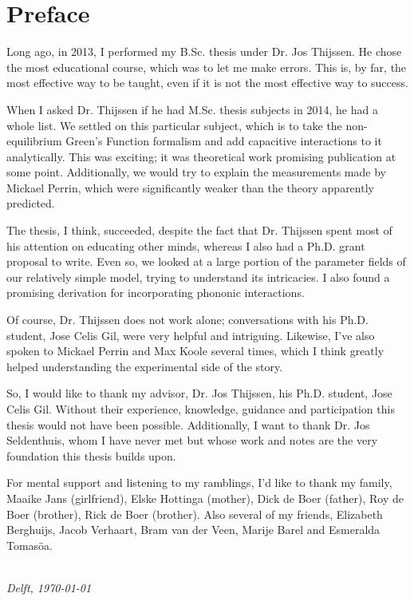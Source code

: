 \chapter*{Preface}

Long ago, in 2013, I performed my B.Sc. thesis under Dr. Jos Thijssen. He chose the most educational course, which was to let me make errors. This is, by far, the most effective way to be taught, even if it is not the most effective way to success.

When I asked Dr. Thijssen if he had M.Sc. thesis subjects in 2014, he had a whole list. We settled on this particular subject, which is to take the non-equilibrium Green's Function formalism and add capacitive interactions to it analytically.  This was exciting; it was theoretical work promising publication at some point. Additionally, we would try to explain the measurements made by Mickael Perrin, which were significantly weaker than the theory apparently predicted.

The thesis, I think, succeeded, despite the fact that Dr. Thijssen spent most of his attention on educating other minds, whereas I also had a Ph.D. grant proposal to write. Even so, we looked at a large portion of the parameter fields of our relatively simple model, trying to understand its intricacies. I also found a promising derivation for incorporating phononic interactions.

Of course, Dr. Thijssen does not work alone; conversations with his Ph.D. student, Jose Celis Gil, were very helpful and intriguing. Likewise, I've also spoken to Mickael Perrin and Max Koole several times, which I think greatly helped understanding the experimental side of the story. 

So, I would like to thank my advisor, Dr. Jos Thijssen, his Ph.D. student, Jose Celis Gil. Without their experience, knowledge, guidance and participation this thesis would not have been possible. Additionally, I want to thank Dr. Jos Seldenthuis, whom I have never met but whose work and notes are the very foundation this thesis builds upon.

For mental support and listening to my ramblings, I'd like to thank my family, Maaike Jans (girlfriend), Elske Hottinga (mother), Dick de Boer (father), Roy de Boer (brother), Rick de Boer (brother). Also several of my friends, Elizabeth Berghuijs, Jacob Verhaart, Bram van der Veen, Marije Barel and Esmeralda Tomas\"oa.


\begin{flushright}
{\makeatletter\itshape
    \@firstname\ \@lastname \\
    Delft, \today
\makeatother}
\end{flushright}

